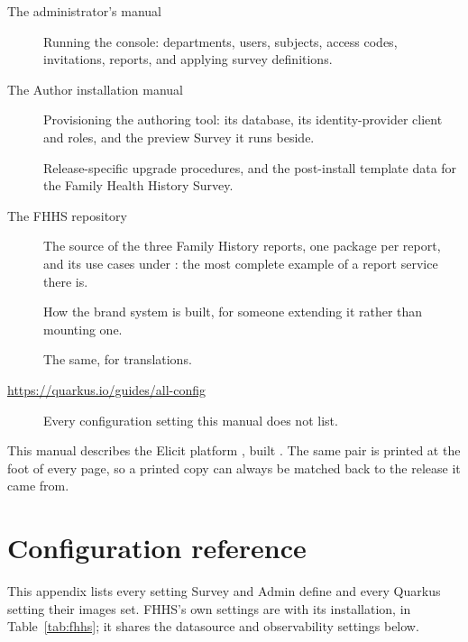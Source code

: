 \documentclass[11pt, a4paper]{article}
\begin{document}
\begin{description}
  \item[The administrator's manual] Running the console: departments, users, subjects, access
        codes, invitations, reports, and applying survey definitions.
  \item[The Author installation manual] Provisioning the authoring tool: its database, its
        identity-provider client and roles, and the preview Survey it runs beside.
  \item[] Release-specific upgrade procedures, and the post-install
        template data for the Family Health History Survey.
  \item[The FHHS repository] The source of the three Family History reports, one package per
        report, and its use cases under : the most complete example of
        a report service there is.
  \item[] How the brand system is built, for
        someone extending it rather than mounting one.
  \item[] The same, for translations.
  \item[\url{https://quarkus.io/guides/all-config}] Every configuration setting this manual
        does not list.
\end{description}

\vspace{1em}

\begin{elicitnote}
This manual describes the Elicit platform \textbf{\elicitVersion}, built
\textbf{\elicitBuildDate}. The same pair is printed at the foot of every page, so a printed
copy can always be matched back to the release it came from.
\end{elicitnote}

\appendix
\renewcommand{\thesection}{\Alph{section}}

\section{Configuration reference}
\label{sec:config}

This appendix lists every setting Survey and Admin define and every Quarkus setting their
images set. FHHS's own settings are with its installation, in Table~\ref{tab:fhhs}; it shares
the datasource and observability settings below.
\end{document}
